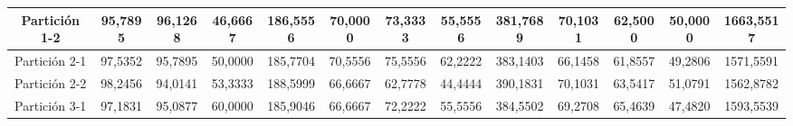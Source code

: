 \documentclass[12pt]{article}
\begin{document}
\begin{table}[H]
{\begin{tabular}{|c|cccc|cccc|cccc|}
Partición 1-2 & \multicolumn{1}{c|}{95,7895}                                                  & \multicolumn{1}{c|}{96,1268}                                                 & \multicolumn{1}{c|}{46,6667} & 186,5556 & \multicolumn{1}{c|}{70,0000}                                                  & \multicolumn{1}{c|}{73,3333}                                                 & \multicolumn{1}{c|}{55,5556} & 381,7689 & \multicolumn{1}{c|}{70,1031}                                                  & \multicolumn{1}{c|}{62,5000}                                                 & \multicolumn{1}{c|}{50,0000} & 1663,5517 \\ \hline
Partición 2-1 & \multicolumn{1}{c|}{97,5352}                                                  & \multicolumn{1}{c|}{95,7895}                                                 & \multicolumn{1}{c|}{50,0000} & 185,7704 & \multicolumn{1}{c|}{70,5556}                                                  & \multicolumn{1}{c|}{75,5556}                                                 & \multicolumn{1}{c|}{62,2222} & 383,1403 & \multicolumn{1}{c|}{66,1458}                                                  & \multicolumn{1}{c|}{61,8557}                                                 & \multicolumn{1}{c|}{49,2806} & 1571,5591 \\ \hline
Partición 2-2 & \multicolumn{1}{c|}{98,2456}                                                  & \multicolumn{1}{c|}{94,0141}                                                 & \multicolumn{1}{c|}{53,3333} & 188,5999 & \multicolumn{1}{c|}{66,6667}                                                  & \multicolumn{1}{c|}{62,7778}                                                 & \multicolumn{1}{c|}{44,4444} & 390,1831 & \multicolumn{1}{c|}{70,1031}                                                  & \multicolumn{1}{c|}{63,5417}                                                 & \multicolumn{1}{c|}{51,0791} & 1562,8782 \\ \hline
Partición 3-1 & \multicolumn{1}{c|}{97,1831}                                                  & \multicolumn{1}{c|}{95,0877}                                                 & \multicolumn{1}{c|}{60,0000} & 185,9046 & \multicolumn{1}{c|}{66,6667}                                                  & \multicolumn{1}{c|}{72,2222}                                                 & \multicolumn{1}{c|}{55,5556} & 384,5502 & \multicolumn{1}{c|}{69,2708}                                                  & \multicolumn{1}{c|}{65,4639}                                                 & \multicolumn{1}{c|}{47,4820} & 1593,5539 \\ \hline

\end{tabular}}
\end{table}
\end{document}
